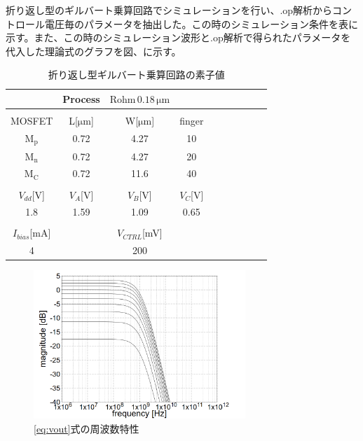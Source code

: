 \documentclass[twocolumn]{jsarticle}
\begin{document}
    折り返し型のギルバート乗算回路でシミュレーションを行い、.op解析からコントロール電圧毎のパラメータを抽出した。この時のシミュレーション条件を表に示す。また、この時のシミュレーション波形と.op解析で得られたパラメータを代入した理論式のグラフを図、に示す。
    \begin{table}[h]
        \caption{折り返し型ギルバート乗算回路の素子値}
        \label{table:state_folded_ac}
        \centering
        \begin{tabular}{cccccccccc}
            \hline
            &Process&$\mathrm{Rohm\,0.18\,\mu m}$&\\
            \hline
            &&&\\
            MOSFET & L[$\mathrm{\mu m}$] & W[$\mathrm{\mu m}$] & finger\\
            \hline \hline
            $\mathrm{M_{p}}$ & 0.72 & 4.27 & 10 \\
            $\mathrm{M_{n}}$ & 0.72 & 4.27 & 20 \\
            $\mathrm{M_{C}}$ & 0.72 & 11.6 & 40 \\
            &&&\\
            $V_{dd}$[V] & $V_{A}$[V] & $V_{B}$[V] & $V_{C}$[V]\\
            \hline\hline
            1.8 & 1.59 & 1.09 & 0.65 \\
            &&&\\
            $I_{bias}$[mA] && $V_{CTRL}$[mV] & \\
            \hline\hline
            4 && 200 & \\
        \end{tabular}
    \end{table}
    \begin{figure}[H]
        \begin{center}
            \includegraphics*[width = 80mm]{figures/vout_ac_theoretical_monochrome.PNG}
            \caption{\eqref{eq:vout}式の周波数特性}
            \label{fig:vout_theoretical}
        \end{center}
    \end{figure}
\end{document}
